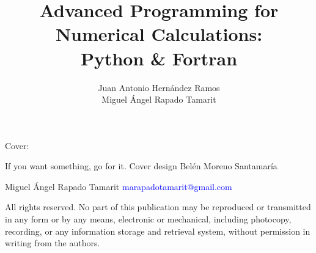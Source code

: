 \documentclass[a4paper,10pt,twoside,english]{book}
\title{{\fontsize{27}{33}\selectfont Advanced Programming for \\ Numerical Calculations:  \\  \vspace{0.8cm} } 
	 {\fontsize{27}{33}\selectfont Python \& Fortran\\ }
	 }
\author{ Juan Antonio Hern\'andez Ramos\\ 	
  	         Miguel \'Angel Rapado Tamarit\\
            \vspace{5cm} } %
\date{  } %
\begin{document}
 
  
  
  
   
    \maketitle
    \thispagestyle{empty}   %
    
    
    \noindent  Cover: 
    
    \noindent If you want something, go for it. Cover design Belén Moreno Santamaría
   
 
    \vfill  
    \begin{minipage}[b]{0.9\textwidth}
        
        \vspace*{2\baselineskip}
        Miguel Ángel Rapado Tamarit \newline
        \textcolor{Blue}{marapadotamarit@gmail.com}
        \vspace*{3\baselineskip}
        
        
    \end{minipage}
    
    \noindent
    All rights reserved.
    No part of this publication may be reproduced or transmitted in any form or by any means, electronic or mechanical, including photocopy, recording, or any information storage and retrieval system, without permission in writing from the authors. 
    \vspace{2\baselineskip}
    
\end{document}
